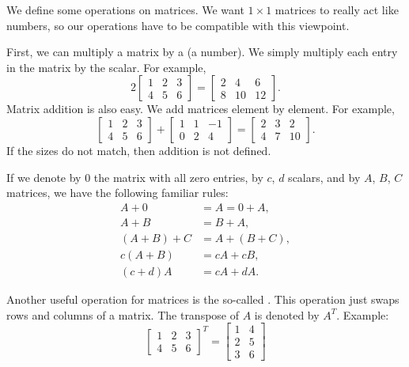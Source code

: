 We define some operations on matrices.  We 
want $1 \times 1$ matrices to really act like numbers, so our operations
have to be compatible with this viewpoint.

First, we can multiply a matrix by
a \emph{} (a number).
We simply multiply each entry in the matrix by the scalar.  For example,
\begin{equation*}
2
\begin{bmatrix}
1 & 2 & 3 \\
4 & 5 & 6
\end{bmatrix} =
\begin{bmatrix}
2 & 4 & 6 \\
8 & 10 & 12
\end{bmatrix} .
\end{equation*}
Matrix addition is also easy.
We add matrices element by element.
For example,
\begin{equation*}
\begin{bmatrix}
1 & 2 & 3 \\
4 & 5 & 6
\end{bmatrix} +
\begin{bmatrix}
1 & 1 & -1 \\
0 & 2 & 4
\end{bmatrix}
=
\begin{bmatrix}
2 & 3 & 2 \\
4 & 7 & 10
\end{bmatrix} .
\end{equation*}
If the sizes do not match, then addition is not defined.

If we denote by 0 the matrix with all zero entries, by
$c$, $d$ scalars, and by $A$, $B$, $C$ matrices, we
have the following familiar rules:
\begin{align*}
A + 0 & = A = 0 + A , \\
A + B & = B + A , \\
(A + B) + C & = A + (B + C) , \\
c(A+B) & = cA+cB, \\
(c+d)A & = cA + dA.
\end{align*}

Another useful operation for matrices is the so-called
\emph{}.  This operation just swaps rows and columns of a
matrix.
The transpose of $A$ is denoted by $A^T$.  Example:
\begin{equation*}
\begin{bmatrix}
1 & 2 & 3 \\
4 & 5 & 6
\end{bmatrix}^T =
\begin{bmatrix}
1 & 4 \\
2 & 5 \\
3 & 6 
\end{bmatrix}
\end{equation*}

